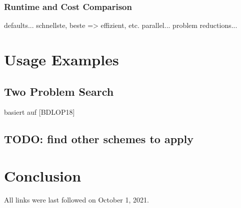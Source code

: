\documentclass[
  a4paper,  %
  twoside,  %
  bibliography=totoc,
  headsepline,
  cleardoublepage=empty,
  parskip=half,
  draft=false
]{scrbook}
\begin{document}
\subsection{Runtime and Cost Comparison}
defaults...
schnellste, beste => effizient, etc. parallel... problem reductions...



\chapter{Usage Examples}
\section{Two Problem Search}
basiert auf [BDLOP18]
\section{TODO: find other schemes to apply}


\chapter{Conclusion}

\printbibliography

All links were last followed on October 1, 2021.

\appendix


\pagestyle{empty}
\renewcommand*{\chapterpagestyle}{empty}
\Versicherung
\end{document}

